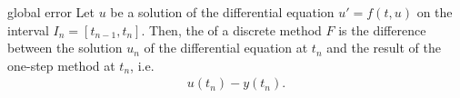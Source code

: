 \begin{Definition}{global error}
  Let $u$ be a solution of the differential equation $u' = f(t,u)$
  on the interval $I_n = [t_{n-1}, t_{n}]$. Then, the  of a discrete method $F$ is the difference between the
  solution $u_n$ of the differential equation at $t_n$ and the result
  of the one-step method at $t_n$, i.e.
  \begin{gather} \label{eq:explicit:5a} %
    u(t_n) - y(t_n).
  \end{gather}
\end{Definition}

